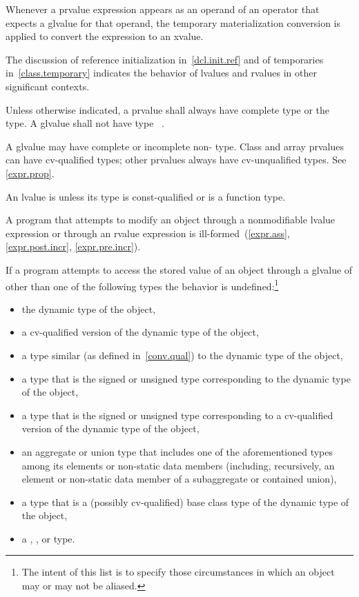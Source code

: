 \pnum
Whenever a prvalue expression appears as an operand of an operator that
expects a glvalue for that operand, the
temporary materialization conversion is
applied to convert the expression to an xvalue.

\pnum
The discussion of reference initialization in~\ref{dcl.init.ref} and of
temporaries in~\ref{class.temporary} indicates the behavior of lvalues
and rvalues in other significant contexts.

\pnum
Unless otherwise indicated,
a prvalue shall always have complete type or the  type.
A glvalue shall not have type \cv{}~.
\begin{note}
A glvalue may have complete or incomplete non- type.
Class and array prvalues can have cv-qualified types; other prvalues
always have cv-unqualified types. See \ref{expr.prop}.
\end{note}

\pnum
An lvalue is  unless its type is const-qualified
or is a function type.
\begin{note}
A program that attempts
to modify an object through a nonmodifiable lvalue expression or through an rvalue expression
is ill-formed~(\ref{expr.ass}, \ref{expr.post.incr}, \ref{expr.pre.incr}).
\end{note}

\pnum
If a program attempts to access the stored value of an object through a glvalue
of other than one of the following types the behavior is
undefined:\footnote{The intent of this list is to specify those circumstances in which an
object may or may not be aliased.}
\begin{itemize}
\item the dynamic type of the object,

\item a cv-qualified version of the dynamic type of the object,

\item a type similar (as defined in~\ref{conv.qual}) to the dynamic type
of the object,

\item a type that is the signed or unsigned type corresponding to the
dynamic type of the object,

\item a type that is the signed or unsigned type corresponding to a
cv-qualified version of the dynamic type of the object,

\item an aggregate or union type that includes one of the aforementioned types among its
elements or non-static data members (including, recursively, an element or non-static data member of a
subaggregate or contained union),

\item a type that is a (possibly cv-qualified) base class type of the dynamic type of
the object,

\item a , , or  type.
\end{itemize}

